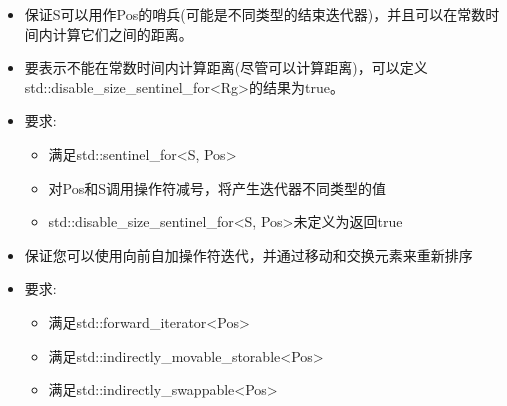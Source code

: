 
\begin{itemize}
\item
保证S可以用作Pos的哨兵(可能是不同类型的结束迭代器)，并且可以在常数时间内计算它们之间的距离。

\item
要表示不能在常数时间内计算距离(尽管可以计算距离)，可以定义std::disable\_size\_sentinel\_for<Rg>的结果为true。

\item
要求:
\begin{itemize}
\item
满足std::sentinel\_for<S, Pos> 

\item
对Pos和S调用操作符减号，将产生迭代器不同类型的值

\item
std::disable\_size\_sentinel\_for<S, Pos>未定义为返回true
\end{itemize}
\end{itemize}



\begin{itemize}
\item
保证您可以使用向前自加操作符迭代，并通过移动和交换元素来重新排序

\item
要求:
\begin{itemize}
\item
满足std::forward\_iterator<Pos> 

\item
满足std::indirectly\_movable\_storable<Pos>

\item
满足std::indirectly\_swappable<Pos>
\end{itemize}
\end{itemize}


